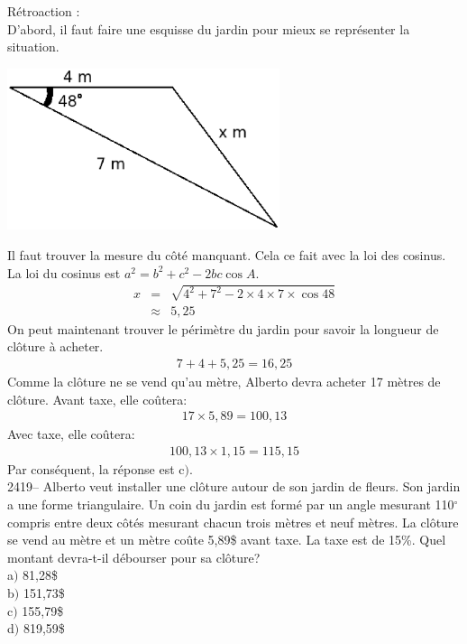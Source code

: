 \documentclass[letterpaper, 12pt]{article}
\begin{document}
R\'etroaction :\\
D'abord, il faut faire une esquisse du jardin pour mieux se repr\'esenter la situation.
\begin{center}
 \includegraphics[width=8cm,bb=0 555 494 842]{Q2418.eps}
\end{center}
Il faut trouver la mesure du c\^ot\'e manquant. Cela ce fait avec la loi des cosinus. La loi du cosinus est $a^{2}=b^{2}+c^{2}-2bc\cos{A}$.
\begin{eqnarray*}
 x &=& \sqrt{4^{2}+7^{2}-2\times4\times7\times\cos{48}}\\
  &\approx& 5,25
\end{eqnarray*}
On peut maintenant trouver le p\'erim\`etre du jardin pour savoir la longueur de cl\^oture \`a acheter.
\begin{eqnarray*}
 7+4+5,25=16,25
\end{eqnarray*}
Comme la cl\^oture ne se vend qu'au m\`etre, Alberto devra acheter 17 m\`etres de cl\^oture. Avant taxe, elle co\^utera:
\begin{eqnarray*}
  17 \times 5,89 = 100,13
\end{eqnarray*}
Avec taxe, elle co\^utera:
\begin{eqnarray*}
 100,13 \times 1,15 = 115,15
\end{eqnarray*}
Par cons\'equent, la r\'eponse est c$)$.\\

2419-- Alberto veut installer une cl\^oture autour de son jardin de fleurs. Son jardin a une forme triangulaire. Un coin du jardin est form\'e par un angle mesurant 110$^{\circ}$ compris entre deux c\^ot\'es mesurant chacun trois m\`etres et neuf m\`etres. La cl\^oture se vend au m\`etre et un m\`etre co\^ute 5,89\$ avant taxe. La taxe est de 15\%. Quel montant devra-t-il d\'ebourser pour sa cl\^oture? \\

a$)$ 81,28\$\\
b$)$ 151,73\$\\
c$)$ 155,79\$\\
d$)$ 819,59\$\\
\end{document}
